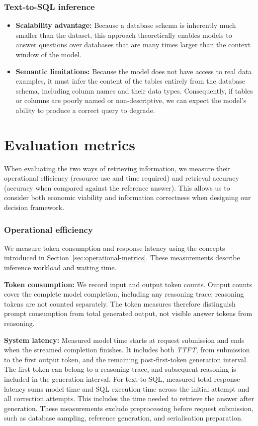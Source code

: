 \subsubsection{Text-to-SQL inference}

\begin{itemize}
  \item \textbf{Scalability advantage:} Because a database schema is inherently much smaller than the
    dataset, this approach theoretically enables models to answer questions over databases that are many
    times larger than the context window of the model.
  \item \textbf{Semantic limitations:} Because the model does not have access to real data examples, it must
    infer the content of the tables entirely from the database schema, including column names and their data
    types. Consequently, if tables or columns are poorly named or non-descriptive, we can expect the
    model's ability to produce a correct query to degrade.
\end{itemize}

\section{Evaluation metrics} \label{sec:evaluation-metrics-implementation}

When evaluating the two ways of retrieving information, we measure their operational efficiency (resource
use and time required) and retrieval accuracy (accuracy when compared against the reference answer).
This allows us to consider both economic viability and information correctness when designing our decision framework.

\subsubsection{Operational efficiency} We measure token consumption and response latency using the concepts
introduced in Section~\ref{sec:operational-metrics}. These measurements describe inference workload and waiting time.

\textbf{Token consumption:} We record input and output token counts. Output counts cover the complete model
completion, including any reasoning trace; reasoning tokens are not counted separately. The token measures
therefore distinguish prompt consumption from total generated output, not visible answer tokens from reasoning.

\textbf{System latency:} Measured model time starts at request submission and ends when the streamed
completion finishes. It includes both \emph{TTFT}, from submission to the first output
token, and the remaining post-first-token generation interval. The first token can belong to a reasoning
trace, and subsequent reasoning is included in the generation interval. For text-to-SQL, measured total
response latency sums model time and SQL execution time across the initial attempt and all correction
attempts. This includes the time needed to retrieve the answer after generation. These measurements exclude
preprocessing before request submission, such as database sampling, reference generation, and serialisation preparation.


